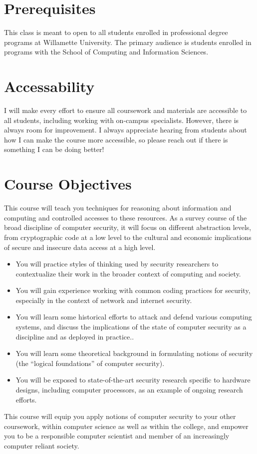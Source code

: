 \documentclass[11pt]{article}
\begin{document}

\section*{Prerequisites}

This class is meant to open to all students enrolled in professional degree programs at Willamette University. The primary audience is students enrolled in programs with the School of Computing and Information Sciences.

\section*{Accessability}

I will make every effort to ensure all coursework and materials are accessible to all students, including working with on-campus specialists. However, there is always room for improvement. I always appreciate hearing from students about how I can make the course more accessible, so please reach out if there is something I can be doing better!


\section*{Course Objectives}
This course will teach you techniques for reasoning about information and computing and controlled accesses to these resources. As a survey course of the broad discipline of computer security, it will focus on different abstraction levels, from cryptographic code at a low level to the cultural and economic implications of secure and insecure data access at a high level.
\begin{itemize}
\item You will practice styles of thinking used by security researchers to contextualize their work in the broader context of computing and society.
\item You will gain experience working with common coding practices for security, especially in the context of network and internet security.
\item You will learn some historical efforts to attack and defend various computing systems, and discuss the implications of the state of computer security as a discipline and as deployed in practice..
\item You will learn some theoretical background in formulating notions of security (the ``logical foundations'' of computer security).
\item You will be exposed to state-of-the-art security research specific to hardware designs, including computer processors, as an example of ongoing research efforts.
\end{itemize}
This course will equip you apply notions of computer security to your other coursework, within computer science as well as within the college, and empower you to be a responsible computer scientist and member of an increasingly computer reliant society.
\end{document}
